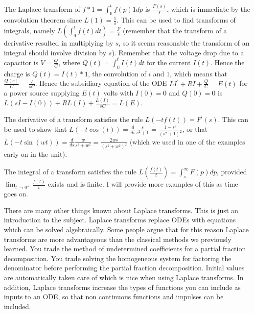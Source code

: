 The Laplace transform of $f*1 = \int_0^t f(p)1 dp$ is $\frac{F(s)}{s}$, which is immediate by the convolution theorem since $L(1)=\frac{1}{s}$. This can be used to find transforms of integrals, namely $L(\int_0^t f(t) dt) = \frac{F}{s}$ (remember that the transform of a derivative resulted in multiplying by $s$, so it seems reasonable the transform of an integral should involve division by $s$).
Remember that the voltage drop due to a capacitor is $V=\frac{Q}{C}$, where $Q(t) = \int_0^t I(t)dt$ for the current $I(t)$.  Hence the charge is $Q(t)=I(t)*1$, the convolution of $i$ and $1$, which means that $\frac{Q(s)}{C} = \frac{I}{sC}$.  Hence the subsidiary equation of the ODE $LI^{\prime} + RI + \frac{Q}{C}=E(t)$ for a power source supplying $E(t)$ volts with $I(0)=0$ and $Q(0)=0$ is $L(sI-I(0))+RL(I)+\frac{L(I)}{sC} = L(E)$.

The derivative of a transform satisfies the rule $L(-tf(t))=F^\prime(s)$.  This can be used to show that $L(-t\cos(t)) = \frac{d}{ds}\frac{s}{s^2+1} = \frac{1-s^2}{(s^2+1)^2}$, or that $L(-t\sin(wt)) = \frac{d}{ds}\frac{w}{s^2+w^2} = \frac{2ws}{(s^2+w^2)^2}$ (which we used in one of the examples early on in the unit).

The integral of a transform satisfies the rule $L\left(\frac{f(t)}{t}\right)=\int_s^\infty F(p)dp$, provided $\lim_{t\to 0^+}\frac{f(t)}{t}$ exists and is finite. I will provide more examples of this as time goes on.

There are many other things known about Laplace transforms.  This is just an introduction to the subject. 
Laplace transforms replace ODEs with equations which can be solved algebraically.  Some people argue that for this reason Laplace transforms are more advantageous than the classical methods we previously learned.  You trade the method of undetermined coefficients for a partial fraction decomposition.  You trade solving the homogeneous system for factoring the denominator before performing the partial fraction decomposition.  Initial values are automatically taken care of which is nice when using Laplace transforms.  In addition, Laplace transforms increase the types of functions you can include as inputs to an ODE, so that non continuous functions and impulses can be included. 


